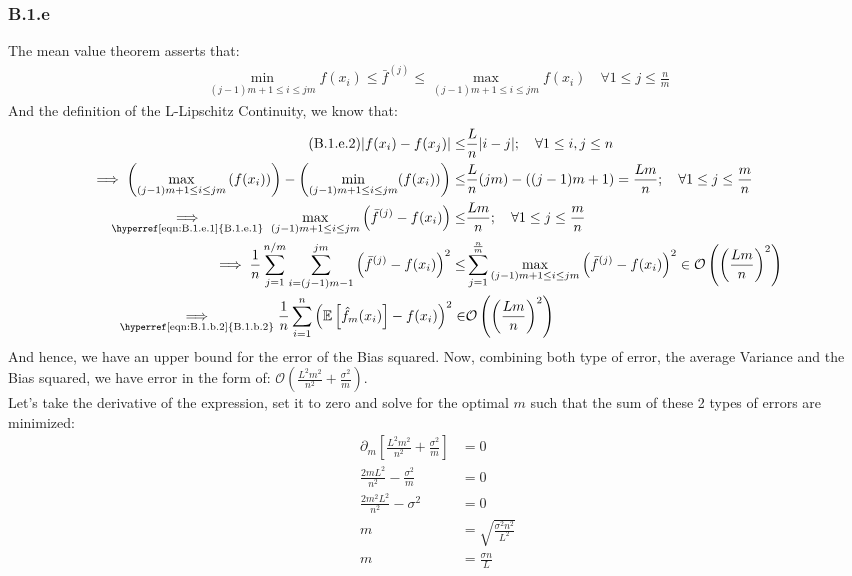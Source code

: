 \documentclass[]{article}
\begin{document}
	\subsubsection*{B.1.e}
		The mean value theorem asserts that: 
		\begin{align*}\tag{B.1.e.1}\label{eqn:B.1.e.1}
			\min_{(j - 1)m + 1\le i\le jm} f(x_i)\le 
			\bar{f}^{(j)}
			\le \max_{(j - 1)m +1\le i \le jm} f(x_i)
			\quad \forall 1 \le j \le \frac{n}{m}
		\end{align*}
		And the definition of the L-Lipschitz Continuity, we know that: 
		\begin{align*}\tag{B.1.e.2}\label{eqn:B.1.e.2}
			|f(x_i) - f(x_j)| \le& \frac{L}{n}|i - j| ;\quad \forall 1 \le i,j \le n
			\\
			\implies
			\left(
				\max_{(j - 1)m + 1\le i \le jm}
				\left(
					f(x_i) 
				\right)
			\right)
			- 
			\left(
				\min_{(j - 1)m + 1\le i \le jm}
				(f(x_i))
			\right)
			\le& \frac{L}{n}(jm) - ((j-1)m + 1) = \frac{Lm}{n}
			;\quad \forall 1 \le j \le \frac{m}{n}
			\\
			\underset{\text{
				\hyperref[eqn:B.1.e.1]{B.1.e.1}
			}}{\implies}
			\max_{(j-1)m + 1 \le i \le jm}
			\left(
				\bar{f}^{(j)} - f(x_i)
			\right)
			\le&
			\frac{Lm}{n} ;\quad\forall 1 \le j \le \frac{m}{n}
			\\
			\implies
			\frac{1}{n}\sum_{j = 1}^{n/m}\sum_{i = (j - 1)m - 1}^{jm}\left(
				\bar{f}^{(j)} - f(x_i)
			\right)^2
			\le&
			\sum_{j = 1}^{\frac{n}{m}}
			\max_{(j-1)m + 1 \le i \le jm}
			\left(
				\bar{f}^{(j)} - f(x_i)
			\right)^2
			\in
			\mathcal{O}
			\left(
				\left(
					\frac{Lm}{n}
				\right)^2
			\right)
			\\
			\underset{
				\text{\hyperref[eqn:B.1.b.2]{B.1.b.2}}
				}
				{\implies}
			\frac{1}{n}\sum_{i = 1}^{n}\left(\mathbb{E}\left[\hat{f}_m(x_i)\right] - f(x_i)\right)^2
			\in&
			\mathcal{O}
			\left(
				\left(
					\frac{Lm}{n}
				\right)^2
			\right)
		\end{align*}
		And hence, we have an upper bound for the error of the Bias squared. Now, combining both type of error, the average Variance and the Bias squared, we have error in the form of: $\mathcal{O}(\frac{L^2m^2}{n^2} + \frac{\sigma^2}{m})$. 
		\\[1em]
		Let's take the derivative of the expression, set it to zero and solve for the optimal $m$ such that the sum of these 2 types of errors are minimized: 
		\begin{align*}\tag{B.1.e.3}\label{eqn:B.1.e.3}
			\partial_m 
			\left[ 
				\frac{L^2m^2}{n^2} + \frac{\sigma^2}{m}
			\right] &= 0
			\\
			\frac{2mL^2}{n^2} - \frac{\sigma^2}{m} &= 0
			\\
			\frac{2m^2L^2}{n^2} - \sigma^2 &= 0
			\\
			m &= \sqrt{\frac{\sigma^2 n^2}{L^2}}
			\\
			m &= \frac{\sigma n}{L}
		\end{align*}
\end{document}
